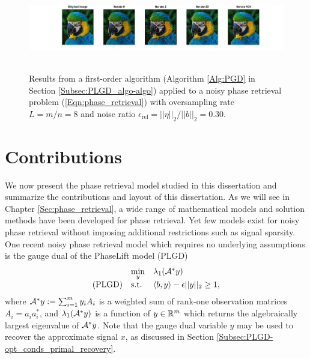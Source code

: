 \begin{figure}[H]
\centering
\hbox{\hspace{-2.55cm} \includegraphics[scale=0.6]{parrot_signal_iterates} }
\caption{Results from a first-order algorithm (Algorithm \ref{Alg:PGD} in Section \ref{Subsec:PLGD_algo-algo}) applied to a noisy phase retrieval problem (\ref{Eqn:phase_retrieval}) with oversampling rate $L = m/n=8$ and noise ratio $\epsilon_\text{rel} = ||\eta||_2 / ||b||_2 = 0.30$.}
\label{Fig:parrot_signal_iterates}
\end{figure}






\section{Contributions}		\label{Subsec:Intro-contributions}


We now present the phase retrieval model studied in this dissertation and summarize the contributions and layout of this dissertation.
As we will see in Chapter \ref{Sec:phase_retrieval}, a wide range of mathematical models and solution methods have been developed for phase retrieval.
Yet few models exist for noisy phase retrieval without imposing additional restrictions such as signal sparsity.  
One recent noisy phase retrieval model which requires no underlying assumptions is the gauge dual of the PhaseLift model (PLGD)
\begin{equation} \label{Eqn:PhaseLift-GD}
\begin{array}{lll}
	&	\min\limits_{\substack{y}}
		&	\lambda_1({\mathcal A}^* y)
		\\
\textnormal{(PLGD)}
	&	\textnormal{s.t.}
		&	\langle b, y \rangle - \epsilon ||y||_2 \geq 1,
\end{array}
\end{equation}
where  ${\mathcal A}^* y := \sum_{i=1}^m y_i A_i$ is a weighted sum of rank-one observation matrices $A_i = a_ia_i^*$, 
and $\lambda_1({\mathcal A}^* y)$ is a function of $y \in {\mathbb R}^m$ which returns the algebraically largest eigenvalue of ${\mathcal A}^*y$.
Note that the gauge dual variable $y$ may be used to recover the approximate signal $x$, as discussed in Section \ref{Subsec:PLGD-opt_conds_primal_recovery}.

